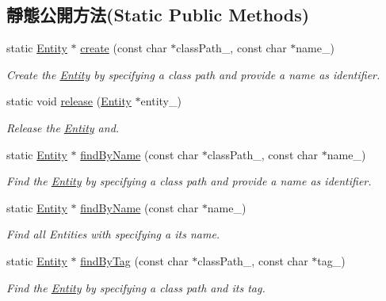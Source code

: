 \subsection*{靜態公開方法(Static Public Methods)}
\begin{DoxyCompactItemize}
\item 
static \hyperlink{class_magnum_1_1_entity}{Entity} $\ast$ \hyperlink{class_magnum_1_1_entity_a23b08d85a88f3346ca1833ebd8a48b61}{create} (const char $\ast$class\+Path\+\_\+, const char $\ast$name\+\_\+)
\begin{DoxyCompactList}\small\item\em Create the \hyperlink{class_magnum_1_1_entity}{Entity} by specifying a class path and provide a name as identifier. \end{DoxyCompactList}\item 
static void \hyperlink{class_magnum_1_1_entity_a055ac09f7e01765eaa8894723c3024c5}{release} (\hyperlink{class_magnum_1_1_entity}{Entity} $\ast$entity\+\_\+)
\begin{DoxyCompactList}\small\item\em Release the \hyperlink{class_magnum_1_1_entity}{Entity} and. \end{DoxyCompactList}\item 
static \hyperlink{class_magnum_1_1_entity}{Entity} $\ast$ \hyperlink{class_magnum_1_1_entity_a2498f266d451dc9666c12b8e7c9b456d}{find\+By\+Name} (const char $\ast$class\+Path\+\_\+, const char $\ast$name\+\_\+)
\begin{DoxyCompactList}\small\item\em Find the \hyperlink{class_magnum_1_1_entity}{Entity} by specifying a class path and provide a name as identifier. \end{DoxyCompactList}\item 
static \hyperlink{class_magnum_1_1_entity}{Entity} $\ast$ \hyperlink{class_magnum_1_1_entity_aebb48b61877838c79db84676a8c8f2f6}{find\+By\+Name} (const char $\ast$name\+\_\+)
\begin{DoxyCompactList}\small\item\em Find all Entities with specifying a its name. \end{DoxyCompactList}\item 
static \hyperlink{class_magnum_1_1_entity}{Entity} $\ast$ \hyperlink{class_magnum_1_1_entity_af11cacde05a933a1ac7663d4956d2e25}{find\+By\+Tag} (const char $\ast$class\+Path\+\_\+, const char $\ast$tag\+\_\+)
\begin{DoxyCompactList}\small\item\em Find the \hyperlink{class_magnum_1_1_entity}{Entity} by specifying a class path and its tag. \end{DoxyCompactList}\item 

\end{DoxyCompactItemize}
